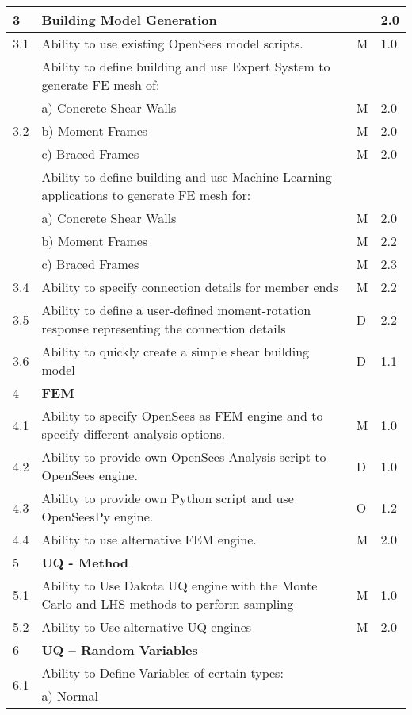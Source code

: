 {\begin{longtable}{| p{} | p{} | p{} | p{} |}
	3 & \textbf{Building Model Generation} &  & 2.0 \\ \hline
	3.1 & Ability to use existing OpenSees model scripts. & M & 1.0 \\ \hline
	\multirow{5}{*}{3.2}  & Ability to define building and use Expert System to generate FE mesh of: &  &  \\
	 & a)     Concrete Shear Walls & M & 2.0 \\ 
	 & b)     Moment Frames & M & 2.0 \\ 
	 & c)     Braced Frames & M & 2.0  \\ \hline
	\multirow{5}{*}{3.3} & Ability to define building and use Machine Learning applications to generate FE mesh for: &  &  \\ 
	 & a)     Concrete Shear Walls & M & 2.0 \\ 
	 & b)     Moment Frames & M & 2.2 \\ 
	 & c)     Braced Frames & M & 2.3  \\ \hline
	3.4 & Ability to specify connection details for member ends & M & 2.2 \\ \hline
	3.5 & Ability to define a user-defined moment-rotation response representing the connection details & D & 2.2 \\ \hline
	3.6 & Ability to quickly create a simple shear building model & D & 1.1 \\ \hline
	4 & \textbf{FEM} &  &  \\ \hline
	4.1 & Ability to specify OpenSees as FEM engine and to specify different analysis options. & M & 1.0 \\ \hline
	4.2 & Ability to provide own OpenSees Analysis script to OpenSees engine. & D & 1.0 \\ \hline
	4.3 & Ability to provide own Python script and use OpenSeesPy engine. & O & 1.2 \\ \hline
	4.4 & Ability to use alternative FEM engine. & M & 2.0 \\ \hline
	5 & \textbf{UQ - Method} &  &  \\ \hline
	5.1 & Ability to Use Dakota UQ engine with the Monte Carlo and LHS methods to perform sampling & M & 1.0 \\ \hline
	5.2 & Ability to Use alternative UQ engines & M & 2.0 \\ \hline
    6 & \textbf{UQ – Random Variables} &  &  \\ \hline
	\multirow{5}{*}{6.1} & Ability to Define Variables of certain types: &  &  \\ 
	 & a)     Normal &  &  \\ 

\end{longtable}}
